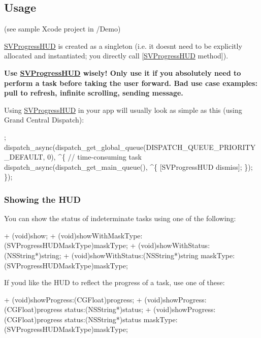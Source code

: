 \subsection*{Usage}

(see sample Xcode project in {\ttfamily /\+Demo})

{\ttfamily \mbox{\hyperlink{interface_s_v_progress_h_u_d}{S\+V\+Progress\+H\+UD}}} is created as a singleton (i.\+e. it doesn\textquotesingle{}t need to be explicitly allocated and instantiated; you directly call {\ttfamily \mbox{[}\mbox{\hyperlink{interface_s_v_progress_h_u_d}{S\+V\+Progress\+H\+UD}} method\mbox{]}}).

{\bfseries Use {\ttfamily \mbox{\hyperlink{interface_s_v_progress_h_u_d}{S\+V\+Progress\+H\+UD}}} wisely! Only use it if you absolutely need to perform a task before taking the user forward. Bad use case examples\+: pull to refresh, infinite scrolling, sending message.}

Using {\ttfamily \mbox{\hyperlink{interface_s_v_progress_h_u_d}{S\+V\+Progress\+H\+UD}}} in your app will usually look as simple as this (using Grand Central Dispatch)\+:


\begin{DoxyCode}
;
dispatch\_async(dispatch\_get\_global\_queue(DISPATCH\_QUEUE\_PRIORITY\_DEFAULT, 0), ^\{
    // time-consuming task
    dispatch\_async(dispatch\_get\_main\_queue(), ^\{
        [SVProgressHUD dismiss];
    \});
\});
\end{DoxyCode}


\subsubsection*{Showing the H\+UD}

You can show the status of indeterminate tasks using one of the following\+:


\begin{DoxyCode}
+ (void)show;
+ (void)showWithMaskType:(SVProgressHUDMaskType)maskType;
+ (void)showWithStatus:(NSString*)string;
+ (void)showWithStatus:(NSString*)string maskType:(SVProgressHUDMaskType)maskType;
\end{DoxyCode}


If you\textquotesingle{}d like the H\+UD to reflect the progress of a task, use one of these\+:


\begin{DoxyCode}
+ (void)showProgress:(CGFloat)progress;
+ (void)showProgress:(CGFloat)progress status:(NSString*)status;
+ (void)showProgress:(CGFloat)progress status:(NSString*)status maskType:(SVProgressHUDMaskType)maskType;
\end{DoxyCode}


